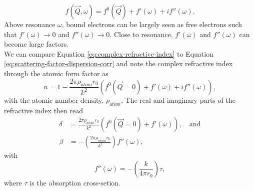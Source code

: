 \begin{equation}
f\left(\vec{Q},\omega\right)=f^{0}\left(\vec{Q}\right)+f'\left(\omega\right)+i f''\left(\omega\right).
\label{eq:scattering-factor-dispersion-corr}
\end{equation}
Above resonance $\omega$, bound electrons can be largely seen as free electrons such that $f'\left(\omega\right)\rightarrow 0$ and $f''\left(\omega\right)\rightarrow 0$. Close to resonance, $f'\left(\omega\right)$ and $f''\left(\omega\right)$ can become large factors.\\[1\baselineskip]
%
We can compare Equation \eqref{eq:complex-refractive-index} to Equation \eqref{eq:scattering-factor-dispersion-corr} and note the complex refractive index through the atomic form factor as \citep{Als-Nielson-2011-JWS}
\begin{equation}
n= 1- \frac{2\pi \rho_{atom}r_{0}}{k^{2}}\left(f^{0}\left(\vec{Q}=0\right)+f'\left(\omega\right)+i f''\left(\omega\right)\right),
\label{eq:eq:complex-refractive-index-atomic-factors}
\end{equation}
with the atomic number density, $\rho_{atom}$. The real and imaginary parts of the refractive index then read
\begin{align}
\delta &= \frac{2 \pi \rho_{atom} r_{0}}{k^{2}}\left(f^{0}\left(\vec{Q}=0\right)+f'\left(\omega\right)\right),\quad \text{and}\\
\beta &= - \left(\frac{2\pi \rho_{atom}r_{0}}{k^{2}}\right)f''\left(\omega\right),
\label{eq:delta-and-beta}
\end{align}
with
\begin{equation}
f''\left(\omega\right)=-\left(\frac{k}{4\pi r_{0}}\right)\tau,
\label{eq:f-2-definition}
\end{equation}
where $\tau$ is the absorption cross-setion.
%
%
%
%
%
%
%
